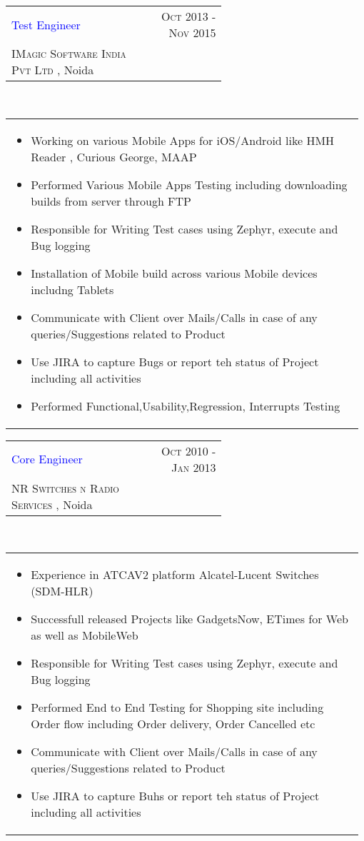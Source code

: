 \documentclass[a4paper]{article} %
\newcommand{\verticalspacing}{-0.25cm}
\newcommand{\bulletspace}{0.7cm}
\newcommand{\projectheadspacing}{6.9cm}
\newcommand{\cproject}[5]{%
    \begin{tabular}{p{0.60\linewidth}r}
        \textcolor{blue}{\small #2} & \multicolumn{1}{m{ \projectheadspacing{} }}{\raggedleft \small {\textsc{#1}}}\\
        \small {#3} & \small {#4}
    \end{tabular}\\
    \begin{tabular}{p{0.98\linewidth}}
    \vspace{-0.3cm}
        \small{#5}
    \end{tabular}
    \vspace{\verticalspacing{}}
}
\begin{document}
\cproject
      {Oct 2013 - Nov 2015}
      {Test Engineer}
      {\textsc{IMagic Software India Pvt Ltd }, Noida}
      {}
      {%
        \begin{itemize}[leftmargin=\bulletspace{}]
        \item Working on various Mobile Apps for iOS/Android like HMH Reader , Curious George, MAAP
          \item Performed Various Mobile Apps Testing including downloading builds from server through FTP
          \item Responsible for Writing Test cases using Zephyr, execute and Bug logging
          \item Installation of Mobile build across various Mobile devices includng Tablets
	    \item Communicate with Client over Mails/Calls in case of any queries/Suggestions related to Product
          \item Use JIRA to capture Bugs or report teh status of Project including all activities
          \item Performed Functional,Usability,Regression, Interrupts Testing
        \end{itemize}
  } 

\cproject
      {Oct 2010 - Jan 2013}
      {Core Engineer}
      {\textsc{NR Switches n Radio Services }, Noida}
      {}
      {%
        \begin{itemize}[leftmargin=\bulletspace{}]
        \item Experience in ATCAV2 platform Alcatel-Lucent Switches (SDM-HLR)
          \item Successfull released Projects like GadgetsNow, ETimes for Web as well as MobileWeb
          \item Responsible for Writing Test cases using Zephyr, execute and Bug logging
          \item Performed End to End Testing for Shopping site including Order flow including Order delivery, Order Cancelled etc
	    \item Communicate with Client over Mails/Calls in case of any queries/Suggestions related to Product
          \item Use JIRA to capture Buhs or report teh status of Project including all activities
        \end{itemize}
  } 
\end{document}
